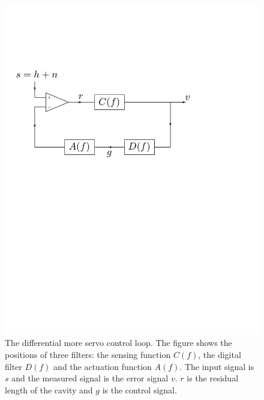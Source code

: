 \begin{figure}[p]
\begin{center}
\includegraphics[width=\linewidth]{figures/inspiral/darm}
\end{center}
\caption[Differential mode control servo loop]{%
\label{f:darmloop}
The differential more servo control loop. The figure shows the positions of
three filters: the sensing function $C(f)$, the digital filter $D(f)$ and
the actuation function $A(f)$. The input signal is $s$ and the measured signal
is the error signal $v$. $r$ is the residual length of the cavity and $g$ is
the control signal.
}
\end{figure}

